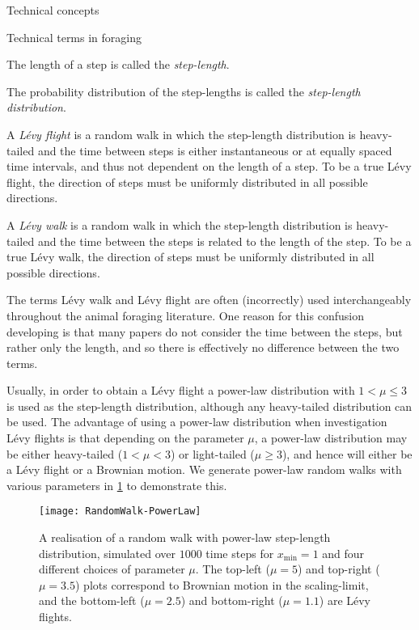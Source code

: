 \begin{section}{Technical concepts \label{sec:tc}}
\begin{subsection}{Technical terms in foraging \label{sec:foraging_terms}}
	\begin{definition}
		The length of a step is called the \emph{step-length}. 
	\end{definition}

	\begin{definition}
	The probability distribution of the step-lengths is called the \emph{step-length distribution}.
	\end{definition}	
	
	\begin{definition}
	A \emph{L\'{e}vy flight} is a random walk in which the step-length distribution is heavy-tailed and the time between steps is either instantaneous or at equally spaced time intervals, and thus not dependent on the length of a step. To be a true L\'{e}vy flight, the direction of steps must be uniformly distributed in all possible directions.
	\end{definition}
	
	\begin{definition}
		A \emph{L\'{e}vy walk} is a random walk in which the step-length distribution is heavy-tailed and the time between the steps is related to the length of the step. To be a true L\'{e}vy walk, the direction of steps must be uniformly distributed in all possible directions.
	\end{definition}

	The terms L\'{e}vy walk and L\'{e}vy flight are often (incorrectly) used interchangeably throughout the animal foraging literature. One reason for this confusion developing is that many papers do not consider the time between the steps, but rather only the length, and so there is effectively no difference between the two terms.
	
	Usually, in order to obtain a L\'{e}vy flight a power-law distribution with $1 < \mu \leq 3$ is used as the step-length distribution, although any heavy-tailed distribution can be used. The advantage of using a power-law distribution when investigation L\'{e}vy flights is that depending on the parameter $\mu$, a power-law distribution may be either heavy-tailed ($1 < \mu <3$) or light-tailed ($\mu \geq 3$), and hence will either be a L\'{e}vy flight or a Brownian motion. We generate power-law random walks with various parameters in \cref{fig:RandomWalk-PowerLaw} to demonstrate this.
	
	\begin{figure}[H]
		\centering
		\texttt{[image: RandomWalk-PowerLaw]}
		\caption[Comparison of different choices of parameter for a random walk with power-law distributed steps]{A realisation of a random walk with power-law step-length distribution, simulated over $1000$ time steps for $x_{\min}=1$ and four different choices of parameter $\mu$. The top-left ($\mu=5$) and top-right ($\mu=3.5$) plots correspond to Brownian motion in the scaling-limit, and the bottom-left ($\mu=2.5$) and bottom-right ($\mu=1.1$) are L\'{e}vy flights.}
		\label{fig:RandomWalk-PowerLaw}
	\end{figure}


\end{subsection}
\end{section}
